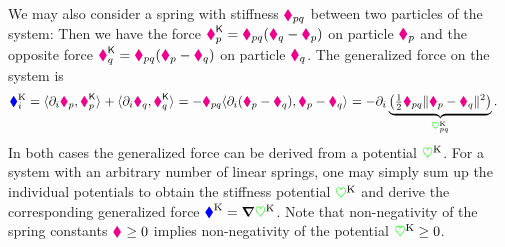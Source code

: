 We may also consider a spring with stiffness $\particleStiffness{\PidxI\PidxII}$ between two particles of the system:
Then we have the force $\particleForceStiff{\PidxI} = \particleStiffness{\PidxI\PidxII} (\particlePos{\PidxII} - \particlePos{\PidxI})$ on particle $\particlePos{\PidxI}$ and the opposite force $\particleForceStiff{\PidxII} = \particleStiffness{\PidxI\PidxII} (\particlePos{\PidxI} - \particlePos{\PidxII})$ on particle $\particlePos{\PidxII}$.
The generalized force on the system is
\begin{align}
 \genForceStiffCoeff{\LidxI} &= \sProd{\dirDiff{\LidxI} \particlePos{\PidxI}}{\particleForceStiff{\PidxI}} + \sProd{\dirDiff{\LidxI} \particlePos{\PidxII}}{\particleForceStiff{\PidxII}} 
 = -\particleStiffness{\PidxI\PidxII} \sProd{\dirDiff{\LidxI} (\particlePos{\PidxI} - \particlePos{\PidxII})}{\particlePos{\PidxI} - \particlePos{\PidxII}}
 = -\dirDiff{\LidxI} \underbrace{\big( \tfrac{1}{2} \particleStiffness{\PidxI\PidxII} \norm{\particlePos{\PidxI} - \particlePos{\PidxII}}^2 \big)}_{\potentialStiff_{\PidxI\PidxII}}.
\end{align}
In both cases the generalized force can be derived from a potential $\potentialStiff$.
For a system with an arbitrary number of linear springs, one may simply sum up the individual potentials to obtain the stiffness potential $\potentialStiff$ and derive the corresponding generalized force $\genForceStiff = \differential \potentialStiff$. 
Note that non-negativity of the spring constants $\particleStiffness{} \geq 0$ implies non-negativity of the potential $\potentialStiff \geq 0$.



